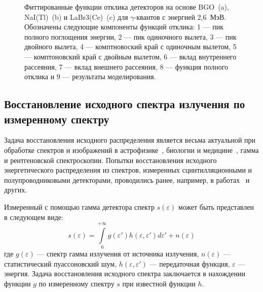 \begin{figure}[ht]
  \caption{ Фиттированные функции отклика детекторов на основе BGO~(a), NaI(Tl)~(b) и LaBr3(Ce)~(c) для $\gamma$-квантов с энергией 2,6~МэВ. Обозначены следующие компоненты функций отклика: 1 --- пик полного поглощения энергии, 2 --- пик одиночного вылета, 3 --- пик двойного вылета, 4 --- комптновоский край с одиночным вылетом, 5 — комптоновский край с двойным вылетом, 6 --- вклад внутреннего рассеяния, 7 --- вклад внешнего рассеяния, 8 --- функция полного отклика и 9 --- результаты моделирования.~\cite{Grozdanov2021}}
  \label{fig:scintillatorResponseExample}
\end{figure}


\FloatBarrier
\subsection{Восстановление исходного спектра излучения по измеренному спектру}
\label{sec:deconvolutionMlemMethod}

Задача восстановления исходного распределения является весьма актуальной при обработке спектров и изображений в астрофизике~\cite{JungRichardt2016}, биологии и медицине~\cite{Vardi1985}, гамма и рентгеновской спектроскопии. Попытки восстановления исходного энергетического распределения из спектров, измеренных сцинтилляционными и полупроводниковыми детекторами, проводились ранее, например, в работах~\cite{Raad2008,Meng2000} и других.

Измеренный с помощью гамма детектора спектр $s(\varepsilon)$ может быть представлен в следующем виде:
\begin{equation}
  \label{eq:BaseConvolution}
  s(\varepsilon) = \int \limits_0^{+\infty} g( \varepsilon' ) h( \varepsilon, \varepsilon' ) d \varepsilon' + n(\varepsilon)
\end{equation}
где $g(\varepsilon)$ --- спектр гамма излучения от источника излучения, $n(\varepsilon)$ --- статистический пуассоновский шум, $ h( \varepsilon, \varepsilon' ) $ --- передаточная функция, $\varepsilon$ --- энергия. Задача восстановления исходного спектра заключается в нахождении функции $g$ по измеренному спектру $s$ при известной функции $h$.~\cite{Meng2000,Khilkevitch2013}

